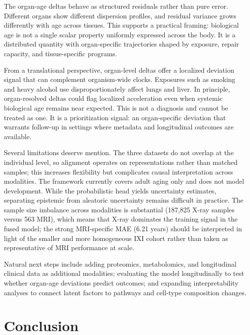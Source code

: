 \documentclass[10pt,twocolumn]{article}
\begin{document}
The organ-age deltas behave as structured residuals rather than pure error. Different organs show
different dispersion profiles, and residual variance grows differently with age across tissues.
This supports a practical framing: biological age is not a single scalar property uniformly expressed
across the body. It is a distributed quantity with organ-specific trajectories shaped by exposure,
repair capacity, and tissue-specific programs.

From a translational perspective, organ-level deltas offer a localized deviation signal that can
complement organism-wide clocks. Exposures such as smoking and heavy alcohol use disproportionately
affect lungs and liver. In principle, organ-resolved deltas could flag localized acceleration even
when systemic biological age remains near expected. This is not a diagnosis and cannot be treated as
one. It is a prioritization signal: an organ-specific deviation that warrants follow-up in settings
where metadata and longitudinal outcomes are available.

Several limitations deserve mention. The three datasets do not overlap at the individual level, so
alignment operates on representations rather than matched samples; this increases flexibility but
complicates causal interpretation across modalities. The framework currently covers adult aging only
and does not model development. While the probabilistic head yields uncertainty estimates, separating
epistemic from aleatoric uncertainty remains difficult in practice. The sample size imbalance across
modalities is substantial (187{,}825 X-ray samples versus 563 MRI), which means that X-ray
dominates the training signal in the fused model; the strong MRI-specific MAE (6.21 years) should
be interpreted in light of the smaller and more homogeneous IXI cohort rather than taken as
representative of MRI performance at scale.

Natural next steps include adding proteomics, metabolomics, and longitudinal clinical data as
additional modalities; evaluating the model longitudinally to test whether organ-age deviations
predict outcomes; and expanding interpretability analyses to connect latent factors to pathways and
cell-type composition changes.

\section{Conclusion}
\end{document}

